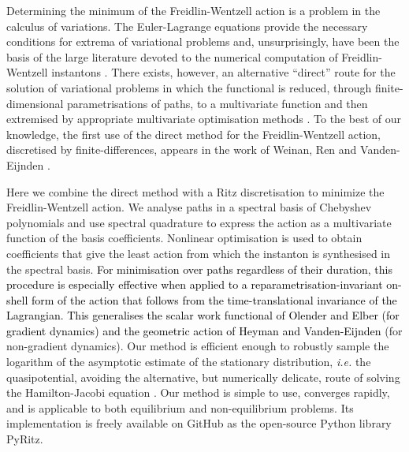 Determining the minimum of the Freidlin-Wentzell action is a problem
in the calculus of variations. The Euler-Lagrange equations provide
the necessary conditions for extrema of variational problems and,
unsurprisingly, have been the basis of the large literature devoted
to the numerical computation of Freidlin-Wentzell instantons \citep{weinanStringMethodStudy2002, paninskiMostLikelyVoltage2006a, vanden-eijndenGeometricMinimumAction2008b, grafkeLongTermEffects2017}.
There exists, however, an alternative ``direct'' route for the solution
of variational problems in which the functional is reduced, through
finite-dimensional parametrisations of paths, to a multivariate function
and then extremised by appropriate multivariate
optimisation methods \citep{gelfandCalculusVariations2012a, kantorovich1958approximate}.
To the best of our knowledge, the first use of the direct method for
the Freidlin-Wentzell action, discretised by finite-differences, appears
in the work of Weinan, Ren and Vanden-Eijnden \citep{eMinimumActionMethod2004a}. 

Here we combine the direct method with a Ritz discretisation \citep{ritz1909uber, gelfandCalculusVariations2012a, kantorovich1958approximate}
to minimize the Freidlin-Wentzell action. We analyse paths in a spectral
basis of Chebyshev polynomials and use spectral quadrature to express
the action as a multivariate function of the basis coefficients. Nonlinear
optimisation is used to obtain coefficients that give the least action
from which the instanton is synthesised in the spectral basis.\textcolor{black}{{}
For minimisation over paths regardless of their duration, this procedure
is especially effective when applied to a reparametrisation-invariant
on-shell form of the action that follows from the time-translational
invariance of the Lagrangian. This generalises the scalar work functional
of Olender and Elber (for gradient dynamics) and the geometric action
of Heyman and Vanden-Eijnden} \citep{vanden-eijndenGeometricMinimumAction2008b} (for non-gradient
dynamics). Our method is efficient enough to robustly sample the logarithm
of the asymptotic estimate of the stationary distribution, \emph{i.e.
}the quasipotential, avoiding the alternative, but numerically delicate,
route of solving the Hamilton-Jacobi equation \citep{cameron2012finding, yang2019computing, dahiyaOrderedLineIntegral2018a}.
Our method is simple to use, converges rapidly, and is applicable
to both equilibrium and non-equilibrium problems. Its implementation
is freely available on GitHub as the open-source Python library PyRitz. 

